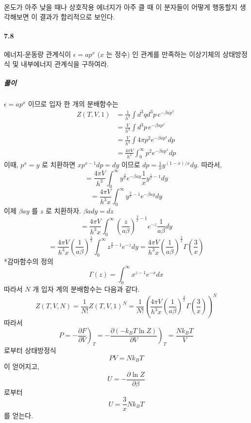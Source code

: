 \documentclass[a4paper,12pt]{report}
\newcommand{\Maxwell}[3][]{\left.\frac{\partial #2}{\partial #3} \right)_{#1} }
\begin{document}
	온도가 아주 낮을 때나 상호작용 에너지가 아주 클 때 이 분자들이 어떻게 행동할지 생각해보면 이 결과가 합리적으로 보인다. 
	\paragraph{7.8 } 에너지-운동량 관계식이 $\epsilon=ap^x$ ($x$ 는 정수) 인 관계를 만족하는 이상기체의 상태방정식 및 내부에너지 관계식을 구하여라. 
	\subparagraph{풀이} $\epsilon=ap^x$ 이므로 입자 한 개의 분배함수는
	\begin{equation*}
		\begin{split}
		Z(T,V,1)&=\frac{1}{h^3}\int d^3qd^3p\,e^{-\beta ap^x}\\
		&=\frac{V}{h^3}\int d^3p\,e^{-\beta ap^x}\\
		&=\frac{V}{h^3}\int 4\pi p^2 e^{-\beta ap^x}dp\\
		&=\frac{4\pi V}{h^3}\int_{0}^{\infty}p^2e^{-\beta ap^x}dp
		\end{split}
	\end{equation*} 
	이때, $p^x=y$ 로 치환하면 $xp^{x-1}dp=dy$ 이므로 $dp=\frac{1}{x}y^{(1-x)/x}dy$. 따라서,
	$$=\frac{4\pi V}{h^3}\int_{0}^{\infty}y^{\frac{2}{x}}e^{-\beta ay}\frac{1}{x}y^{\frac{1}{x}-1}dy$$
	$$=\frac{4\pi V}{h^3x}\int_{0}^{\infty}y^{\frac{3}{x}-1}e^{-\beta ay}dy$$
	이제 $\beta ay$ 를 $z$ 로 치환하자. $\beta ady=dz$
	$$=\frac{4\pi V}{h^3x}\int_{0}^{\infty}{\left( \frac{z}{a\beta}\right) }^{\frac{3}{x}-1}e^{-z}\frac{1}{a\beta}dy$$
	$$=\frac{4\pi V}{h^3x}{\left( \frac{1}{a\beta}\right) }^{\frac{3}{x}}\int_{0}^{\infty}{z }^{\frac{3}{x}-1}e^{-z}dy=\frac{4\pi V}{h^3x}{\left( \frac{1}{a\beta}\right) }^{\frac{3}{x}}\Gamma\left(\frac{3}{x} \right) $$
	*감마함수의 정의
	$$\Gamma(z)=\int_{0}^{\infty}x^{z-1}e^{-x}dx$$
	따라서 $N$ 개 입자 계의 분배함수는 다음과 같다.
	$$Z(T,V,N)=\frac{1}{N!}Z(T,V,1)^N=\frac{1}{N!}\left(\frac{4\pi V}{h^3x}{\left( \frac{1}{a\beta}\right) }^{\frac{3}{x}}\Gamma\left(\frac{3}{x} \right) \right) ^N$$
	따라서
	$$P=-\Maxwell[T]{F}{V}=-\Maxwell[T]{(-k_BT\ln Z)}{V}=\frac{Nk_BT}{V}$$
	로부터 상태방정식
	$$PV=Nk_BT$$
	이 얻어지고,
	$$U=-\frac{\partial \ln Z}{\partial \beta}$$
	로부터
	$$U=\frac{3}{x}Nk_BT$$ 
	를 얻는다. 
\end{document}
